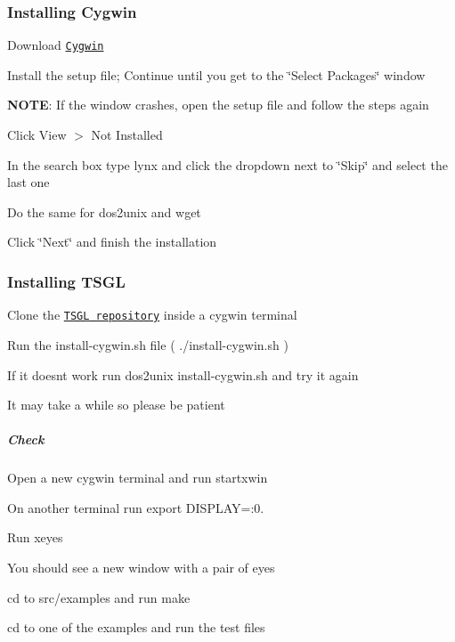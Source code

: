 \subsubsection*{Installing Cygwin}


\begin{DoxyEnumerate}
\item Download \href{https://www.cygwin.com/}{\tt Cygwin}
\item Install the setup file; Continue until you get to the \char`\"{}\+Select Packages\char`\"{} window
\begin{DoxyItemize}
\item {\bfseries N\+O\+TE}\+: If the window crashes, open the setup file and follow the steps again
\end{DoxyItemize}
\item Click View $>$ Not Installed
\item In the search box type {\ttfamily lynx} and click the dropdown next to \char`\"{}\+Skip\char`\"{} and select the last one
\item Do the same for {\ttfamily dos2unix} and {\ttfamily wget}
\item Click \char`\"{}\+Next\char`\"{} and finish the installation
\end{DoxyEnumerate}



\subsubsection*{Installing T\+S\+GL}


\begin{DoxyEnumerate}
\item Clone the \href{https://github.com/Calvin-CS/TSGL.git}{\tt T\+S\+GL repository} inside a cygwin terminal
\item Run the install-\/cygwin.\+sh file ( {\ttfamily ./install-\/cygwin.sh} )
\begin{DoxyItemize}
\item If it doesn\textquotesingle{}t work run {\ttfamily dos2unix install-\/cygwin.\+sh} and try it again
\item It may take a while so please be patient
\end{DoxyItemize}
\end{DoxyEnumerate}

\subparagraph*{Check}


\begin{DoxyItemize}
\item Open a new cygwin terminal and run {\ttfamily startxwin}
\item On another terminal run {\ttfamily export D\+I\+S\+P\+L\+AY=\+:0.}
\item Run {\ttfamily xeyes}
\item You should see a new window with a pair of eyes
\end{DoxyItemize}

cd to src/examples and run {\ttfamily make}
\begin{DoxyEnumerate}
\item cd to one of the examples and run the test files 
\end{DoxyEnumerate}